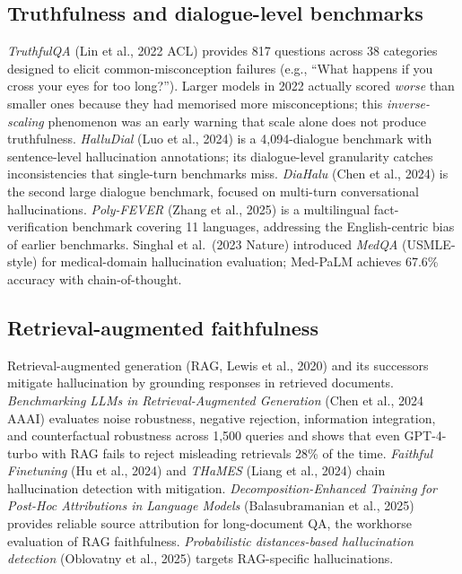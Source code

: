 \subsection{Truthfulness and dialogue-level benchmarks}\label{truthfulness-and-dialogue-level-benchmarks}

\emph{TruthfulQA} (Lin et al., 2022 ACL) provides 817 questions across 38 categories designed to elicit common-misconception failures (e.g., ``What happens if you cross your eyes for too long?''). Larger models in 2022 actually scored \emph{worse} than smaller ones because they had memorised more misconceptions; this \emph{inverse-scaling} phenomenon was an early warning that scale alone does not produce truthfulness. \emph{HalluDial} (Luo et al., 2024) is a 4,094-dialogue benchmark with sentence-level hallucination annotations; its dialogue-level granularity catches inconsistencies that single-turn benchmarks miss. \emph{DiaHalu} (Chen et al., 2024) is the second large dialogue benchmark, focused on multi-turn conversational hallucinations. \emph{Poly-FEVER} (Zhang et al., 2025) is a multilingual fact-verification benchmark covering 11 languages, addressing the English-centric bias of earlier benchmarks. Singhal et al.~(2023 Nature) introduced \emph{MedQA} (USMLE-style) for medical-domain hallucination evaluation; Med-PaLM achieves 67.6\% accuracy with chain-of-thought.

\subsection{Retrieval-augmented faithfulness}\label{retrieval-augmented-faithfulness}

Retrieval-augmented generation (RAG, Lewis et al., 2020) and its successors mitigate hallucination by grounding responses in retrieved documents. \emph{Benchmarking LLMs in Retrieval-Augmented Generation} (Chen et al., 2024 AAAI) evaluates noise robustness, negative rejection, information integration, and counterfactual robustness across 1,500 queries and shows that even GPT-4-turbo with RAG fails to reject misleading retrievals 28\% of the time. \emph{Faithful Finetuning} (Hu et al., 2024) and \emph{THaMES} (Liang et al., 2024) chain hallucination detection with mitigation. \emph{Decomposition-Enhanced Training for Post-Hoc Attributions in Language Models} (Balasubramanian et al., 2025) provides reliable source attribution for long-document QA, the workhorse evaluation of RAG faithfulness. \emph{Probabilistic distances-based hallucination detection} (Oblovatny et al., 2025) targets RAG-specific hallucinations.

